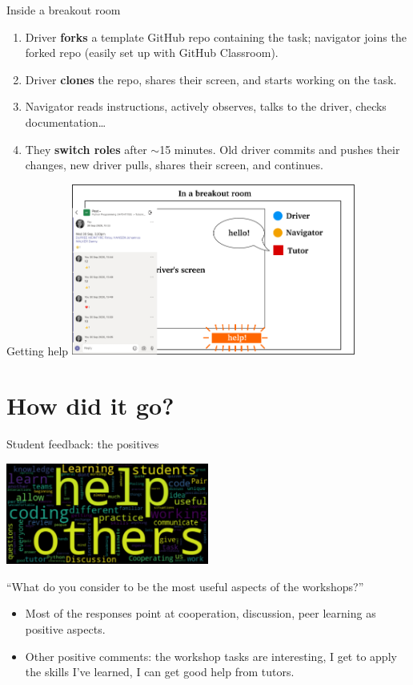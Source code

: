 \documentclass[aspectratio=169, 12pt]{beamer}
\begin{document}
\begin{frame}{Inside a breakout room}
    \begin{enumerate}
        \item Driver \textbf{forks} a template GitHub repo containing the task; navigator joins the forked repo (easily set up with GitHub Classroom).
        \item Driver \textbf{clones} the repo, shares their screen, and starts working on the task.
        \item Navigator reads instructions, actively observes, talks to the driver, checks documentation\ldots
        \item They \textbf{switch roles} after $\sim$15 minutes. Old driver commits and pushes their changes, new driver pulls, shares their screen, and continues.
    \end{enumerate}
\end{frame}

\begin{frame}{Getting help}
    \centering
    \includegraphics[width=0.7\textwidth]{graphics/pairprog_6.png}
\end{frame}

\section{How did it go?}

\begin{frame}{Student feedback: the positives}
    \begin{center}
    \includegraphics[width=0.5\textwidth]{graphics/workshops_feedback_positive.png}

    ``What do you consider to be the most useful aspects of the workshops?''
    \end{center}
    \pause

    \begin{itemize}
        \item Most of the responses point at cooperation, discussion, peer learning as positive aspects.
        \item Other positive comments: the workshop tasks are interesting, I get to apply the skills I've learned, I can get good help from tutors.
    \end{itemize}
\end{frame}
\end{document}
